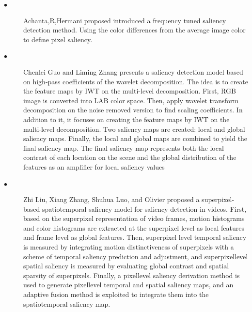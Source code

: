 \begin{description}
\item[$\bullet$] Achanta,R,Hermani\cite{achanta2009frequency}  proposed introduced a frequency tuned saliency detection method. Using the color
differences from the average image color to define pixel saliency.

\item[$\bullet$] Chenlei Guo and Liming Zhang \cite{guo2010novel}  presents a saliency
detection model based on high-pass coefficients of the
wavelet decomposition. The idea is to create the feature maps
by IWT on the multi-level decomposition. First, RGB image
is converted into LAB color space. Then, apply wavelet
transform decomposition on the noise removed version to find
scaling coefficients. In addition to it, it focuses on creating the
feature maps by IWT on the multi-level decomposition. Two
saliency maps are created: local and global saliency maps.
Finally, the local and global maps are combined to yield the
final saliency map. The final saliency map represents both the
local contrast of each location on the scene and the global
distribution of the features as an amplifier for local saliency
values

\item[$\bullet$] Zhi Liu, Xiang Zhang, Shuhua Luo, and Olivier\cite{liu2014superpixel}  proposed a superpixel-based spatiotemporal saliency
model for saliency detection in videos. First, based on the
superpixel representation of video frames, motion histograms
and color histograms are extracted at the superpixel level as
local features and frame level as global features. Then,
superpixel level temporal saliency is measured by integrating
motion distinctiveness of superpixels with a scheme of
temporal saliency prediction and adjustment, and superpixellevel spatial saliency is measured by evaluating global
contrast and spatial sparsity of superpixels. Finally, a pixellevel saliency derivation method is used to generate pixellevel temporal and spatial saliency maps, and an adaptive
fusion method is exploited to integrate them into the
spatiotemporal saliency map.


\end{description}
